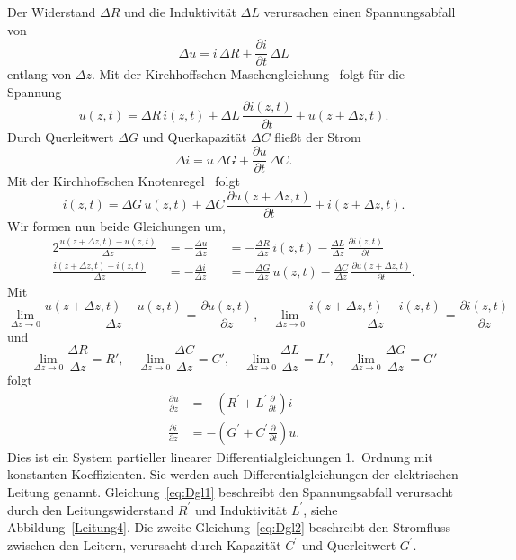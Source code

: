 \documentclass[paper=a4, parskip=half-, ngerman, fontsize=11pt]{scrreprt}
\begin{document}
Der Widerstand $\Delta R$ und die Induktivität $\Delta L$ verursachen einen Spannungsabfall von
\[
\Delta u = i \, \Delta R + \frac{\partial i}{\partial t} \, \Delta L
\]
entlang von $\Delta z$. Mit der Kirchhoffschen Maschengleichung~\cite{Kirchhoff} folgt für die Spannung
\begin{equation*}
u(z, t) = \Delta R \, i(z, t) + \Delta L \, \frac{\partial i(z, t)}{\partial t} + u(z + \Delta z, t).
\end{equation*}
Durch Querleitwert $\Delta G$ und Querkapazität $\Delta C$ fließt der Strom
\[
\Delta i = u \, \Delta G + \frac{\partial u}{\partial t} \, \Delta C.
\]
Mit der Kirchhoffschen Knotenregel~\cite{Kirchhoff} folgt
\begin{equation*}
    i(z, t) = \Delta G \, u(z, t) + \Delta C \, \frac{\partial u(z + \Delta z, t)}{\partial t} + i(z + \Delta z, t).
\end{equation*}
Wir formen nun beide Gleichungen um,
\begin{alignat*}{2}
\frac{u(z + \Delta z, t) - u(z, t)}{\Delta z} &= - \frac{\Delta u}{\Delta z} &&= - \frac{\Delta R}{\Delta z} \, i(z, t)
- \frac{\Delta L}{\Delta z} \, \frac{\partial i(z, t)}{\partial t} \\[1ex]
\frac{i(z + \Delta z, t) - i(z, t)}{\Delta z} &=  - \frac{\Delta i}{\Delta z} &&= - \frac{\Delta G}{\Delta z} \, u(z,
t) - \frac{\Delta C}{\Delta z} \, \frac{\partial u(z + \Delta z, t)}{\partial t}.
\end{alignat*}
Mit
\[
\lim_{\Delta z \to 0} \frac{u(z+\Delta z, t)-u(z, t)}{\Delta z} = \frac{\partial u(z, t)}{\partial z}, \quad
\lim_{\Delta z \to 0} \frac{i(z+\Delta z, t)-i(z, t)}{\Delta z} = \frac{\partial i(z, t)}{\partial z}
\]
und
\[
\lim_{\Delta z \to 0} \frac{\Delta R}{\Delta z} = R', \quad \lim_{\Delta z \to 0} \frac{\Delta C}{\Delta z} = C',
\quad \lim_{\Delta z \to 0} \frac{\Delta L}{\Delta z} = L', \quad \lim_{\Delta z \to 0} \frac{\Delta G}{\Delta z} = G'
\]
folgt
\begin{align}
    \frac{\partial u}{\partial z} &= -\left(R^{\prime} + L^{\prime}\frac{\partial}{\partial t}\right)i \label{eq:Dgl1}
    \\[1ex]
    \frac{\partial i}{\partial z} &= -\left(G^{\prime} + C^{\prime}\frac{\partial}{\partial t}\right)u. \label{eq:Dgl2}
\end{align}
Dies ist ein System partieller linearer Differentialgleichungen 1.~Ordnung mit konstanten Koeffizienten. Sie werden
auch Differentialgleichungen der elektrischen Leitung genannt.
Gleichung~\eqref{eq:Dgl1} beschreibt den Spannungsabfall verursacht durch den Leitungswiderstand $R^{\prime}$ und
Induktivität $L^{\prime}$, siehe Abbildung~\ref{Leitung4}.
Die zweite Gleichung~\eqref{eq:Dgl2} beschreibt den Stromfluss zwischen den Leitern, verursacht durch Kapazität
$C^{\prime}$ und Querleitwert $G^{\prime}$.
\end{document}
